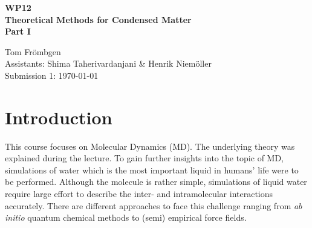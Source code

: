 \documentclass[a4paper,12pt]{scrartcl}
\begin{document}
%
\thispagestyle{empty}

%
\begin{center}
	\begin{LARGE}
		\vspace{50mm}
		\textbf{WP12} \\
		\vspace{15mm}
		\textbf{Theoretical Methods for Condensed Matter} \\
		\vspace{15mm}
		\textbf{Part I} \\
		\vspace{30mm}
	\end{LARGE}
	\begin{large}
		Tom Frömbgen \\
		\vspace{20mm}
		Assistants: Shima Taherivardanjani \& Henrik Niemöller  \\
		\vspace{10mm}
		Submission 1: \today \\
		\vspace{5mm}
	\end{large}
\end{center}

%
\newpage
%
\section{Introduction}
%
	This course focuses on Molecular Dynamics (MD). The underlying theory was explained during the lecture. To gain further insights into the topic of MD, simulations of water which is the most important liquid in humans' life were to be performed. Although the  molecule is rather simple, simulations of liquid water require large effort to describe the inter- and intramolecular interactions accurately. There are different approaches to face this challenge ranging from \emph{ab initio} quantum chemical methods to (semi) empirical force fields.
	
\end{document}
